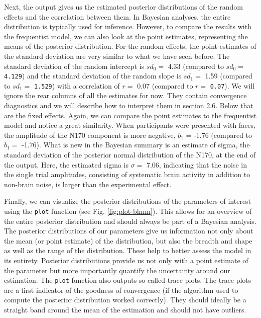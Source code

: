\documentclass[
  doc,12pt,floatsintext]{apa7}
\begin{document}
Next, the output gives us the estimated posterior distributions of the random effects and the correlation between them. In Bayesian analyses, the entire distribution is typically used for inference. However, to compare the results with the frequentist model, we can also look at the point estimates, representing the means of the posterior distribution. For the random effects, the point estimates of the standard deviation are very similar to what we have seen before. The standard deviation of the random intercept is \(sd_0 =\) 4.33 (compared to \(sd_0 =\) \texttt{4.129}) and the standard deviation of the random slope is \(sd_1 =\) 1.59 (compared to \(sd_1 =\) \texttt{1.529}) with a correlation of \(r =\) 0.07 (compared to \(r =\) \texttt{0.07}). We will ignore the rear columns of all the estimates for now. They contain convergence diagnostics and we will describe how to interpret them in section 2.6. Below that are the fixed effects. Again, we can compare the point estimates to the frequentist model and notice a great similarity. When participants were presented with faces, the amplitude of the N170 component is more negative, \(b_1\) = -1.76 (compared to \(b_1 =\) -1.76). What is new in the Bayesian summary is an estimate of sigma, the standard deviation of the posterior normal distribution of the N170, at the end of the output. Here, the estimated sigma is \(\sigma =\) 7.06, indicating that the noise in the single trial amplitudes, consisting of systematic brain activity in addition to non-brain noise, is larger than the experimental effect.

Finally, we can visualize the posterior distributions of the parameters of interest using the \texttt{plot} function (see Fig. \ref{fig:plot-blmm}). This allows for an overview of the entire posterior distribution and should always be part of a Bayesian analysis. The posterior distributions of our parameters give us information not only about the mean (or point estimate) of the distribution, but also the breadth and shape as well as the range of the distribution. These help to better assess the model in its entirety. Posterior distributions provide us not only with a point estimate of the parameter but more importantly quantify the uncertainty around our estimation. The \texttt{plot} function also outputs so called trace plots. The trace plots are a first indicator of the goodness of convergence (if the algorithm used to compute the posterior distribution worked correctly). They should ideally be a straight band around the mean of the estimation and should not have outliers.
\end{document}
